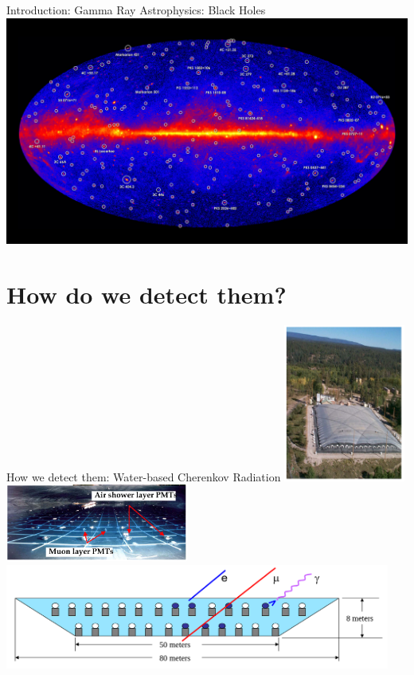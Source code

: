 \documentclass{beamer}
\begin{document}
\begin{frame}{Introduction: Gamma Ray Astrophysics: Black Holes}
\includegraphics[width=\textwidth]{figures/blackHole-1920.jpg}
\end{frame}

\section{How do we detect them?}

\begin{frame}{How we detect them: Water-based Cherenkov Radiation}
\centering
\includegraphics[width=0.3\textwidth]{figures/milagro_4.png}
\includegraphics[width=0.45\textwidth]{figures/milagro_5.png}\\
\includegraphics[width=0.95\textwidth]{figures/milagro_7.png}
\end{frame}
\end{document}
